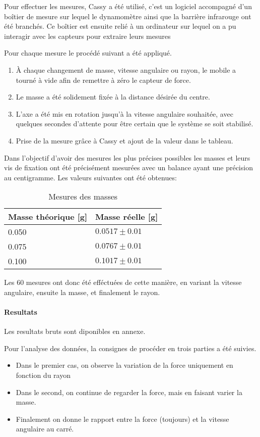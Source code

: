Pour effectuer les mesures, Cassy a été utilisé, c'est un logiciel accompagné d'un boîtier de mesure sur lequel le dynamomètre ainsi que la barrière infrarouge ont été branchés.
Ce boîtier est ensuite relié à un ordinateur sur lequel on a pu interagir avec les capteurs pour extraire leurs mesures

Pour chaque mesure le procédé suivant a été appliqué.
\begin{enumerate}
    \item À chaque changement de masse, vitesse angulaire ou rayon, le mobile a tourné à vide afin de remettre à zéro le capteur de force.
    \item Le masse a été solidement fixée à la distance désirée du centre.
    \item L'axe a été mis en rotation jusqu'à la vitesse angulaire souhaitée, avec quelques secondes d'attente pour être certain que le système se soit stabilisé.
    \item Prise de la mesure grâce à Cassy et ajout de la valeur dans le tableau.
\end{enumerate}

Dans l'objectif d'avoir des mesures les plus précises possibles les masses et leurs vis de fixation ont été précisément mesurées avec un balance ayant une précision au centigramme. Les valeurs suivantes ont été obtenues:
\begin{table}[ht]
    \caption[Mesure des masses]{Mesures des masses}
    \centering
    \begin{tabular}{|l|l|}
	\hline
	Masse théorique [g] & Masse réelle [g]\\
	\hline
	0.050 & $0.0517 \pm 0.01$\\
	0.075 & $0.0767 \pm 0.01$\\
	0.100 & $0.1017 \pm 0.01$\\
	\hline
    \end{tabular}
\end{table}

Les 60 mesures ont donc été efféctuées de cette manière, en variant la vitesse angulaire, ensuite la masse, et finalement le rayon. 

\paragraph{Resultats}
Les resultats bruts sont diponibles en annexe.

Pour l'analyse des données, la consignes de procéder en trois parties a été suivies.
\begin{itemize}
    \item Dans le premier cas, on observe la variation de la force uniquement en fonction du rayon
    \item Dans le second, on continue de regarder la force, mais en faisant varier la masse.
    \item Finalement on donne le rapport entre la force (toujours) et la vitesse angulaire au carré.
\end{itemize}

